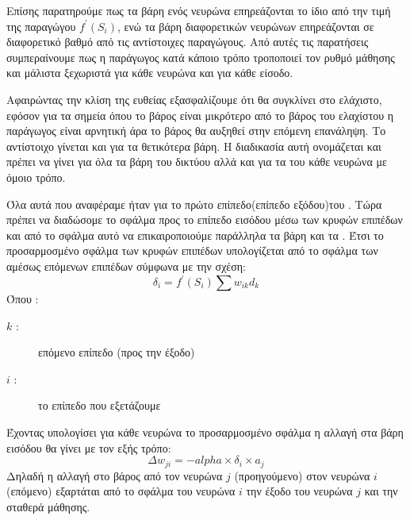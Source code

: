Επίσης παρατηρούμε πως τα βάρη ενός νευρώνα επηρεάζονται το ίδιο από την τιμή της
παραγώγου $f^\prime (S_i)$, ενώ τα βάρη διαφορετικών νευρώνων επηρεάζονται σε διαφορετικό
βαθμό από τις αντίστοιχες παραγώγους. Από αυτές τις παρατήσεις συμπεραίνουμε πως η
παράγωγος κατά κάποιο τρόπο τροποποιεί τον ρυθμό μάθησης και μάλιστα ξεχωριστά για
κάθε νευρώνα και για κάθε είσοδο.

Αφαιρώντας την κλίση της ευθείας εξασφαλίζουμε ότι θα
συγκλίνει στο ελάχιστο, εφόσον για τα σημεία όπου το βάρος είναι μικρότερο από το βάρος
του ελαχίστου η παράγωγος είναι αρνητική άρα το βάρος θα αυξηθεί στην επόμενη
επανάληψη. Το αντίστοιχο γίνεται και για τα θετικότερα βάρη. Η διαδικασία αυτή ονομάζεται
 και πρέπει να γίνει για όλα τα βάρη του δικτύου αλλά και για τα  του
κάθε νευρώνα με όμοιο τρόπο.

Όλα αυτά που αναφέραμε ήταν για το πρώτο επίπεδο(επίπεδο εξόδου)του .
Τώρα πρέπει να διαδώσομε το σφάλμα προς το επίπεδο εισόδου μέσω των κρυφών επιπέδων
και από το σφάλμα αυτό να επικαιροποιούμε παράλληλα τα βάρη και τα . Έτσι το
προσαρμοσμένο σφάλμα των κρυφών επιπέδων υπολογίζεται από το σφάλμα των αμέσως
επόμενων επιπέδων σύμφωνα με την σχέση:
$$\delta _i=f^\prime (S_i)\sum w_{ik}d_k$$
Όπου :
\begin{description}
    \item[$k$ :]  επόμενο επίπεδο (προς την έξοδο)
    \item[$i$ :] το επίπεδο που εξετάζουμε
\end{description}
Έχοντας υπολογίσει για κάθε νευρώνα το προσαρμοσμένο σφάλμα η αλλαγή στα βάρη
εισόδου θα γίνει με τον εξής τρόπο:
$$\Delta w_{ji}=-alpha\times \delta _i\times a_j$$
Δηλαδή η αλλαγή στο βάρος από τον νευρώνα $j$ (προηγούμενο) στον νευρώνα $i$ (επόμενο)
εξαρτάται από το σφάλμα του νευρώνα $i$ την έξοδο του νευρώνα $j$ και την σταθερά μάθησης.
